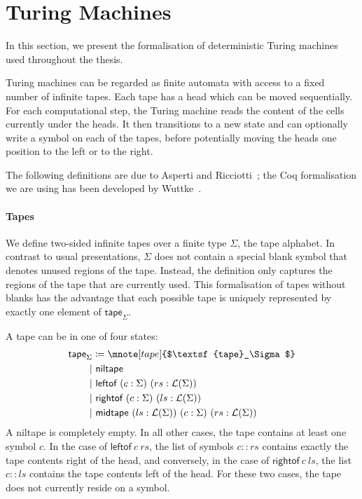 \section{Turing Machines}\label{sec:tm}
In this section, we present the formalisation of deterministic Turing machines used throughout the thesis. 

Turing machines can be regarded as finite automata with access to a fixed number of infinite tapes. Each tape has a head which can be moved sequentially. 
For each computational step, the Turing machine reads the content of the cells currently under the heads. It then transitions to a new state and can optionally write a symbol on each of the tapes, before potentially moving the heads one position to the left or to the right.

The following definitions are due to Asperti and Ricciotti~\cite{asperti_ricciotti}; the Coq formalisation we are using has been developed by Wuttke~\cite{wuttke2017}.

\paragraph{Tapes}
We define two-sided infinite tapes over a finite type $\Sigma$, the tape alphabet. In contrast to usual presentations, $\Sigma$ does not contain a special blank symbol that denotes unused regions of the tape. Instead, the definition only captures the regions of the tape that are currently used. 
This formalisation of tapes without blanks has the advantage that each possible tape is uniquely represented by exactly one element of $\textsf{tape}_\Sigma$. 

A tape can be in one of four states:
\begin{align*}
  \textsf{tape}_\Sigma &  \defeq \mnote[tape]{$\textsf{tape}_\Sigma$}\\
  |&~\textsf{niltape} \\
  |&~\textsf{leftof}~(c : \Sigma)~(rs : \listsof{\Sigma}) \\
  |&~\textsf{rightof}~(c : \Sigma)~(ls : \listsof{\Sigma}) \\
  |&~\textsf{midtape}~(ls : \listsof{\Sigma})~(c : \Sigma)~(rs : \listsof{\Sigma})
\end{align*}
A \textsf{niltape} is completely empty. In all other cases, the tape contains at least one symbol $c$. 
In the case of $\textsf{leftof}~c~rs$, the list of symbols $c::rs$ contains exactly the tape contents right of the head, and conversely, in the case of $\textsf{rightof}~c~ls$, the list $c::ls$ contains the tape contents left of the head. For these two cases, the tape does not currently reside on a symbol.

